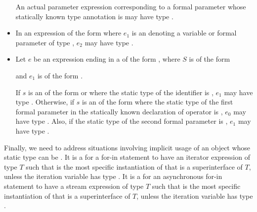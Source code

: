 \documentclass[makeidx]{article}
\begin{document}
\begin{itemize}
  An actual parameter expression corresponding to a formal parameter
  whose statically known type annotation is \VOID{}
  may have type \VOID.
\item
  In an expression of the form 
  where $e_1$ is an 
  denoting a variable or formal parameter of type \VOID,
  $e_2$ may have type \VOID.
\item
  Let $e$ be an expression ending in a 
  of the form ,
  where $S$ is of the form

  \noindent

  \noindent
  and $e_1$ is of the form .

  If $s$ is an  of the
  form  or 
  where the static type of the identifier \id{} is \VOID,
  $e_1$ may have type \VOID.
  Otherwise, if $s$ is an  of the form
  \code{[$\,e_0\,$]} where the static type of
  the first formal parameter in the statically known declaration
  of operator \code{[]=} is \VOID,
  $e_0$ may have type \VOID.
  Also, if the static type of the second formal parameter is \VOID,
  $e_1$ may have type \VOID.
\end{itemize}

\LMHash{}%
Finally, we need to address situations involving implicit usage of
an object whose static type can be \VOID.
%
It is a  for a for-in statement to have an iterator
expression of type $T$ such that 
is the most specific instantiation of 
that is a superinterface of $T$, unless the
iteration variable has type \VOID.
%
It is a  for an asynchronous for-in statement
to have a stream expression of type $T$
such that  is the most specific
instantiation of  that is a superinterface of $T$,
unless the iteration variable has type \VOID.

\end{document}
